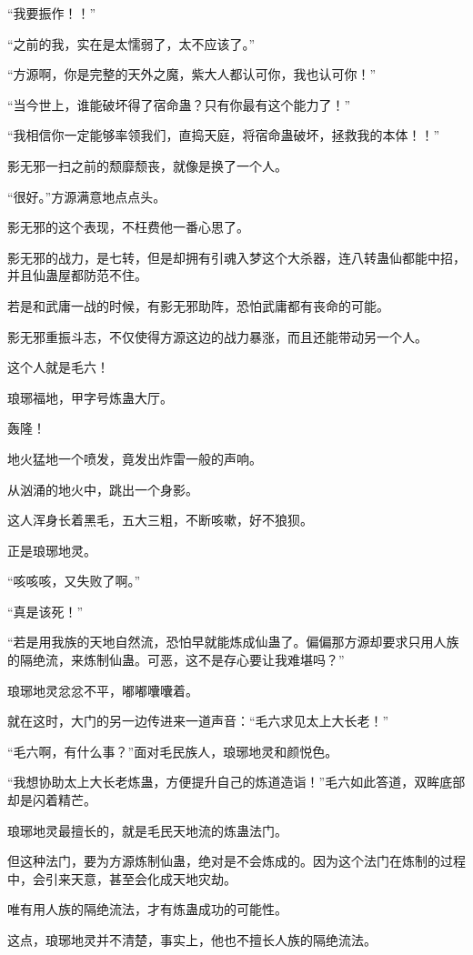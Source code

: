 \begin{this_body}
“我要振作！！”

“之前的我，实在是太懦弱了，太不应该了。”

“方源啊，你是完整的天外之魔，紫大人都认可你，我也认可你！”

“当今世上，谁能破坏得了宿命蛊？只有你最有这个能力了！”

“我相信你一定能够率领我们，直捣天庭，将宿命蛊破坏，拯救我的本体！！”

影无邪一扫之前的颓靡颓丧，就像是换了一个人。

“很好。”方源满意地点点头。

影无邪的这个表现，不枉费他一番心思了。

影无邪的战力，是七转，但是却拥有引魂入梦这个大杀器，连八转蛊仙都能中招，并且仙蛊屋都防范不住。

若是和武庸一战的时候，有影无邪助阵，恐怕武庸都有丧命的可能。

影无邪重振斗志，不仅使得方源这边的战力暴涨，而且还能带动另一个人。

这个人就是毛六！

琅琊福地，甲字号炼蛊大厅。

轰隆！

地火猛地一个喷发，竟发出炸雷一般的声响。

从汹涌的地火中，跳出一个身影。

这人浑身长着黑毛，五大三粗，不断咳嗽，好不狼狈。

正是琅琊地灵。

“咳咳咳，又失败了啊。”

“真是该死！”

“若是用我族的天地自然流，恐怕早就能炼成仙蛊了。偏偏那方源却要求只用人族的隔绝流，来炼制仙蛊。可恶，这不是存心要让我难堪吗？”

琅琊地灵忿忿不平，嘟嘟囔囔着。

就在这时，大门的另一边传进来一道声音：“毛六求见太上大长老！”

“毛六啊，有什么事？”面对毛民族人，琅琊地灵和颜悦色。

“我想协助太上大长老炼蛊，方便提升自己的炼道造诣！”毛六如此答道，双眸底部却是闪着精芒。

琅琊地灵最擅长的，就是毛民天地流的炼蛊法门。

但这种法门，要为方源炼制仙蛊，绝对是不会炼成的。因为这个法门在炼制的过程中，会引来天意，甚至会化成天地灾劫。

唯有用人族的隔绝流法，才有炼蛊成功的可能性。

这点，琅琊地灵并不清楚，事实上，他也不擅长人族的隔绝流法。


\end{this_body}
